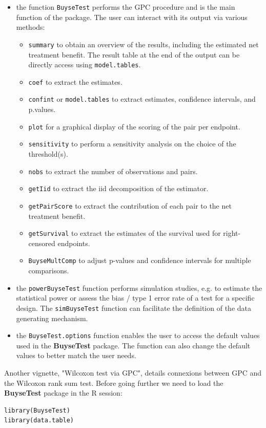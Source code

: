 \documentclass[12pt]{article}
\begin{document}
\begin{itemize}
\item the function \texttt{BuyseTest} performs the GPC procedure and is the main
function of the package. The user can interact with its output via
various methods:
\begin{itemize}
\item \texttt{summary} to obtain an overview of the results, including the
estimated net treatment benefit. The result table at the end of
the output can be directly access using \texttt{model.tables}.
\item \texttt{coef} to extract the estimates.
\item \texttt{confint} or \texttt{model.tables} to extract estimates, confidence intervals, and p.values.
\item \texttt{plot} for a graphical display of the scoring of the pair per endpoint.
\item \texttt{sensitivity} to perform a sensitivity analysis on the choice of the threshold(s).
\item \texttt{nobs} to extract the number of observations and pairs.
\item \texttt{getIid} to extract the iid decomposition of the estimator.
\item \texttt{getPairScore} to extract the contribution of each pair to the net treatment benefit.
\item \texttt{getSurvival} to extract the estimates of the survival used for right-censored endpoints.
\item \texttt{BuyseMultComp} to adjust p-values and confidence intervals for multiple comparisons.
\end{itemize}
\item the \texttt{powerBuyseTest} function performs simulation studies, e.g. to
estimate the statistical power or assess the bias / type 1 error
rate of a test for a specific design. The \texttt{simBuyseTest} function
can facilitate the definition of the data generating mechanism.
\item the \texttt{BuyseTest.options} function enables the user to access the
default values used in the \textbf{BuyseTest} package. The function can
also change the default values to better match the user needs.
\end{itemize}

Another vignette, "Wilcoxon test via GPC", details connexions between
GPC and the Wilcoxon rank sum test. Before going further we need to
load the \textbf{BuyseTest} package in the R session:
\lstset{language=r,label= ,caption= ,captionpos=b,numbers=none}
\begin{lstlisting}
library(BuyseTest)
library(data.table)
\end{lstlisting}
\end{document}

